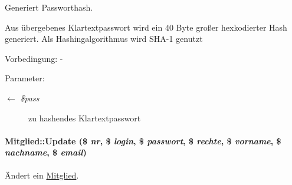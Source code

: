Generiert Passworthash. 

Aus übergebenes Klartextpasswort wird ein 40 Byte großer hexkodierter Hash generiert. Als Hashingalgorithmus wird SHA-1 genutzt \begin{Desc}
\item[Vorbedingung:]- \end{Desc}
\begin{Desc}
\item[Parameter:]
\begin{description}
\item[\mbox{$\leftarrow$} {\em \$pass}]zu hashendes Klartextpasswort \end{description}
\end{Desc}
\hypertarget{classMitglied_0d173487bebdd0579a70ea007b37b5ec}{
\paragraph[Update]{\setlength{\rightskip}{0pt plus 5cm}Mitglied::Update (\$ {\em nr}, \$ {\em login}, \$ {\em passwort}, \$ {\em rechte}, \$ {\em vorname}, \$ {\em nachname}, \$ {\em email})}\hfill}
\label{classMitglied_0d173487bebdd0579a70ea007b37b5ec}


Ändert ein \hyperlink{classMitglied}{Mitglied}. 

